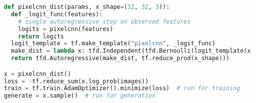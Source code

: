 \begin{lstlisting}[language=python]
def pixelcnn_dist(params, x_shape=(32, 32, 3)):
  def _logit_func(features):
    # single autoregressive step on observed features
    logits = pixelcnn(features)
    return logits
  logit_template = tf.make_template("pixelcnn", _logit_func)
  make_dist = lambda x: tfd.Independent(tfd.Bernoulli(logit_template(x)))
  return tfd.Autoregressive(make_dist, tf.reduce_prod(x_shape)))

x = pixelcnn_dist()
loss = -tf.reduce_sum(x.log_prob(images))
train = tf.train.AdamOptimizer().minimize(loss)  # run for training
generate = x.sample()  # run for generation
\end{lstlisting}
